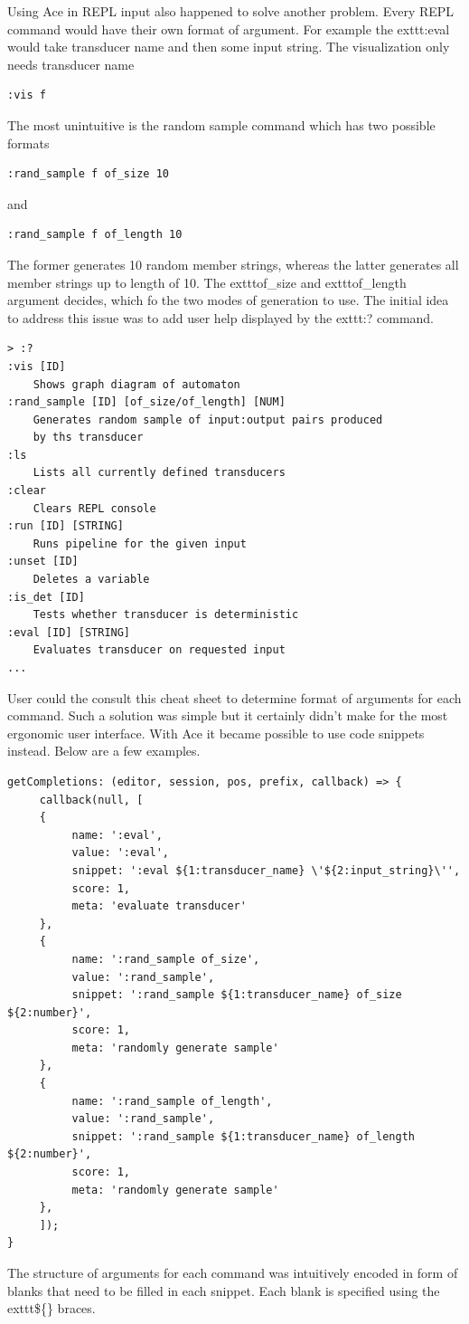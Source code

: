 Using Ace in REPL input also happened to solve another problem. Every REPL command would have their own format of argument. For example the     exttt{:eval} would take transducer name and then some input string. The visualization only needs transducer name
\begin{lstlisting}
:vis f
\end{lstlisting}
 The most unintuitive is the random sample command which has two possible formats
 \begin{lstlisting}
:rand_sample f of_size 10
 \end{lstlisting}
and
 \begin{lstlisting}
:rand_sample f of_length 10
\end{lstlisting}
The former generates 10 random member strings, whereas the latter generates all member strings up to length of 10.
The     exttt{of\_size} and     exttt{of\_length} argument decides, which fo the two modes of generation to use. The initial idea to address this issue was to add user help displayed by the     exttt{:?} command.
\begin{lstlisting}
> :?
:vis [ID]
    Shows graph diagram of automaton
:rand_sample [ID] [of_size/of_length] [NUM]
    Generates random sample of input:output pairs produced 
    by ths transducer
:ls
    Lists all currently defined transducers
:clear
    Clears REPL console
:run [ID] [STRING]
    Runs pipeline for the given input
:unset [ID]
    Deletes a variable
:is_det [ID]
    Tests whether transducer is deterministic
:eval [ID] [STRING]
    Evaluates transducer on requested input
...
\end{lstlisting}
User could the consult this cheat sheet to determine format of arguments for each command. Such a solution was simple but it certainly didn't make for the most ergonomic user interface. With Ace it became possible to use code snippets instead.
Below are a few examples.
\begin{lstlisting}
getCompletions: (editor, session, pos, prefix, callback) => {
     callback(null, [
     {
          name: ':eval',
          value: ':eval',
          snippet: ':eval ${1:transducer_name} \'${2:input_string}\'',
          score: 1,
          meta: 'evaluate transducer'
     },
     {
          name: ':rand_sample of_size',
          value: ':rand_sample',
          snippet: ':rand_sample ${1:transducer_name} of_size ${2:number}',
          score: 1,
          meta: 'randomly generate sample'
     },
     {
          name: ':rand_sample of_length',
          value: ':rand_sample',
          snippet: ':rand_sample ${1:transducer_name} of_length ${2:number}',
          score: 1,
          meta: 'randomly generate sample'
     },
     ]);
}
\end{lstlisting}
The structure of arguments for each command was intuitively encoded in form
of blanks that need to be filled in each snippet. Each blank is specified using the     exttt{\$\{\}} braces.

